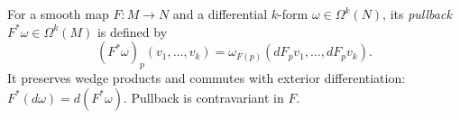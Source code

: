 
For a smooth map $F:M\to N$ and a differential $k$-form $\omega\in\Omega^k(N)$, its \emph{pullback} $F^*\omega\in\Omega^k(M)$ is defined by
\[
(F^*\omega)_p(v_1,\ldots,v_k)=\omega_{F(p)}(dF_pv_1,\ldots,dF_pv_k).
\]
It preserves wedge products and commutes with exterior differentiation: $F^*(d\omega)=d(F^*\omega)$. Pullback is contravariant in $F$.
